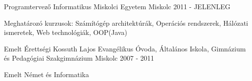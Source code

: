 

\begin{cventries}

  \cventry
    {Programtervező Informatikus} %
    {Miskolci Egyetem} %
    {Miskolc} %
    {2011 - JELENLEG} %
    {
      \begin{cvitems} %
        \item {Meghatározó kurzusok: Számítógép architektúrák, Operációs rendszerek, Hálózati ismeretek, Web technológiák, OOP(Java)}
      \end{cvitems}
    }

	  \cventry
	{Emelt Érettségi} %
	{Kossuth Lajos Evangélikus Óvoda, Általános Iskola, Gimnázium és Pedagógiai
		Szakgimnázium} %
	{Miskolc} %
	{2007 - 2011} %
	{
		\begin{cvitems} %
			\item {Emelt Német és Informatika}
		\end{cvitems}
	}

\end{cventries}
